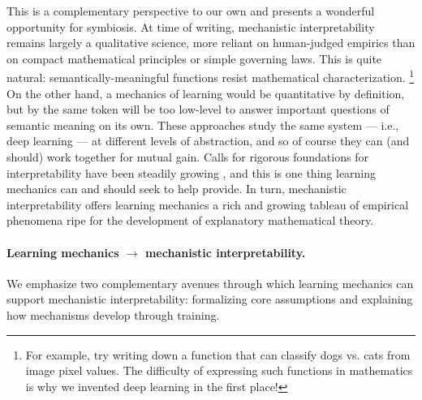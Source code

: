This is a complementary perspective to our own and presents a wonderful opportunity for symbiosis.
At time of writing, mechanistic interpretability remains largely a qualitative science, more reliant on human-judged empirics than on compact mathematical principles or simple governing laws.
This is quite natural: semantically-meaningful functions resist mathematical characterization.%
\footnote{For example, try writing down a function that can classify dogs vs. cats from image pixel values. The difficulty of expressing such functions in mathematics is why we invented deep learning in the first place!}
On the other hand, a mechanics of learning would be quantitative by definition, but by the same token will be too low-level to answer important questions of semantic meaning on its own.
These approaches study the same system --- i.e., deep learning --- at different levels of abstraction, and so of course they can (and should) work together for mutual gain.
Calls for rigorous foundations for interpretability have been steadily growing \citep{sharkey2025open,joshi2026causality,greenspan2026towards}, and this is one thing learning mechanics can and should seek to help provide.
In turn, mechanistic interpretability offers learning mechanics a rich and growing tableau of empirical phenomena ripe for the development of explanatory mathematical theory.












\paragraph{Learning mechanics $\rightarrow$ mechanistic interpretability.}
We emphasize two complementary avenues through which learning mechanics can support mechanistic interpretability: formalizing core assumptions and explaining how mechanisms develop through training.


